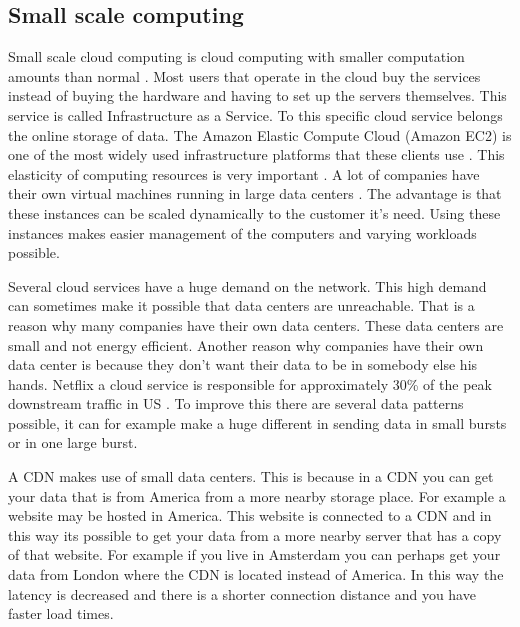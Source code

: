 \documentclass{sig-alternate-br}
\begin{document}
\subsection{Small scale computing}
Small scale cloud computing is cloud computing with smaller computation amounts than normal \cite{cox:2014}. Most users that operate in the cloud buy the services instead of buying the hardware and having to set up the servers themselves. This service is called Infrastructure as a Service. To this specific cloud service belongs the online storage of data. The Amazon Elastic Compute Cloud (Amazon EC2) is one of the most widely used infrastructure platforms that these clients use \cite{hofer:2011}. This elasticity of computing resources is very important \cite{Miettinen:2010:EEM:1863103.1863107}. A lot of companies have their own virtual machines running in large data centers \cite{beloglazov:2010}. The advantage is that these instances can be scaled dynamically to the customer it's need. Using these instances makes easier management of the computers and varying workloads possible. 

Several cloud services have a huge demand on the network. This high demand can sometimes make it possible that data centers are unreachable.
That is a reason why many companies have their own data centers. These data centers are small and not energy efficient. Another reason why companies have their own data center is because they don't want their data to be in somebody else his hands.  Netflix a cloud service is responsible for approximately 30\% of the peak downstream traffic in US \cite{Adhikari:2012, computer-networking}. To improve this there are several data patterns possible, it can for example make a huge different in sending data in small bursts or in one large burst.

A CDN makes use of small data centers. This is because in a CDN you can get your data that is from America from a more nearby storage place. For example a website may be hosted in America. This website is connected to a CDN and in this way its possible to get your data from a more nearby server that has a copy of that website. For example if you live in Amsterdam you can perhaps get your data from London where the CDN is located instead of America. In this way the latency is decreased and there is a shorter connection distance and you have faster load times. 
\end{document}
